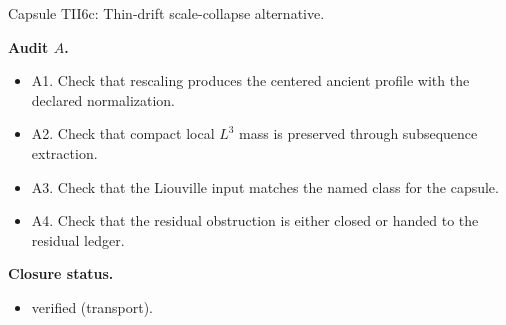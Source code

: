\documentclass[11pt]{amsart}
\newcommand{\capsulefield}[1]{\par\smallskip\noindent\textbf{#1.}\ }
\begin{document}
\begin{proofcapsule}{Capsule TII6c: Thin-drift scale-collapse alternative.}
  \capsulefield{Audit \(A\)}
  \begin{itemize}[leftmargin=1.8em]
  \item A1. Check that rescaling produces the centered ancient profile with the declared normalization.
  \item A2. Check that compact local $L^3$ mass is preserved through subsequence extraction.
  \item A3. Check that the Liouville input matches the named class for the capsule.
  \item A4. Check that the residual obstruction is either closed or handed to the residual ledger.
  \end{itemize}
  \capsulefield{Closure status}
  \begin{itemize}[leftmargin=1.8em]
  \item verified (transport).
  \end{itemize}
\end{proofcapsule}
\end{document}
